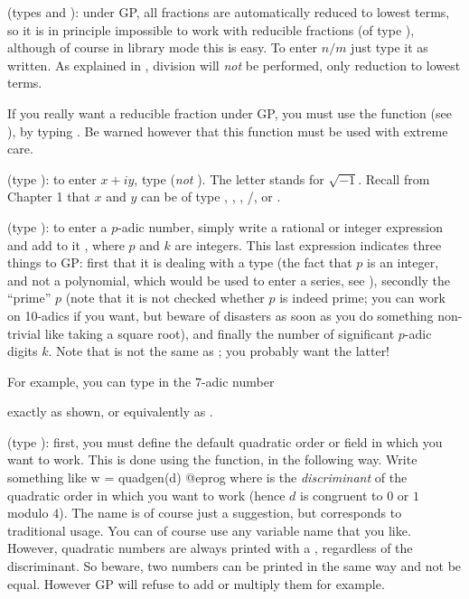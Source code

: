 (types  and ): under GP, all fractions are
automatically reduced to lowest terms, so it is in principle impossible to
work with reducible fractions (of type ), although of course in
library mode this is easy. To enter $n/m$ just type it as written. As
explained in , division will \emph{not} be performed, only
reduction to lowest terms.\label{se:FRAC}

If you really want a reducible fraction under GP, you must use the 
function (see ), by typing . Be warned
however that this function must be used with extreme care.

(type ): to enter $x+iy$, type  (\emph{not}
). The letter  stands for $\sqrt{-1}$. Recall from
Chapter 1 that $x$ and $y$ can be of type , ,
, /, or .

\label{se:padic}
(type ): to enter a $p$-adic number, simply write a
rational or integer expression and add to it , where $p$
and $k$ are integers. This last expression indicates three things to GP:
first that it is dealing with a  type (the fact that $p$ is an
integer, and not a polynomial, which would be used to enter a series, see
), secondly the ``prime'' $p$ (note that it is not
checked whether $p$ is indeed prime; you can work on 10-adics if you want, but
beware of disasters as soon as you do something non-trivial like taking a
square root), and finally the number of significant $p$-adic digits $k$.
Note that  is not the same as ; you probably
want the latter!

For example, you can type in the $7$-adic number


\noindent
exactly as shown, or equivalently as
.

(type ): first, you must define the default quadratic order or
field in which you want to work. This is done using the 
function, in the following way. Write something like
\bprog
w = quadgen(d)
@eprog\noindent
where  is the \emph{discriminant} of the quadratic order in
which you want to work (hence $d$ is congruent to $0$ or $1$ modulo $4$). The
name  is of course just a suggestion, but corresponds to traditional
usage. You can of course use any variable name that you like. However,
quadratic numbers are always printed with a , regardless of the
discriminant. So beware, two numbers can be printed in the same way and not
be equal. However GP will refuse to add or multiply them for example.

